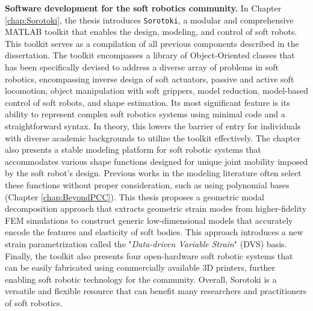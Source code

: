 \textbf{Software development for the soft robotics community.} In Chapter \ref{chap:Sorotoki}, the thesis introduces \texttt{Sorotoki}, a modular and comprehensive MATLAB\textsuperscript{\scriptsize\textregistered} toolkit that enables the design, modeling, and control of soft robots. This toolkit serves as a compilation of all previous components described in the dissertation. The toolkit encompasses a library of Object-Oriented classes that has been specifically devised to address a diverse array of problems in soft robotics, encompassing inverse design of soft actuators, passive and active soft locomotion, object manipulation with soft grippers, model reduction, model-based control of soft robots, and shape estimation. Its most significant feature is its ability to represent complex soft robotics systems using minimal code and a straightforward syntax. In theory, this lowers the barrier of entry for individuals with diverse academic backgrounds to utilize the toolkit effectively. The chapter also presents a stable modeling platform for soft robotic systems that accommodates various shape functions designed for unique joint mobility imposed by the soft robot's design. Previous works in the modeling literature often select these functions without proper consideration, such as using polynomial bases (Chapter \ref{chap:BeyondPCC}). This thesis proposes a geometric modal decomposition approach that extracts geometric strain modes from higher-fidelity FEM simulations to construct generic low-dimensional models that accurately encode the features and elasticity of soft bodies. This approach introduces a new strain parametrization called the "\textit{Data-driven Variable Strain}" (DVS) basis. Finally, the toolkit also presents four open-hardware soft robotic systems that can be easily fabricated using commercially available 3D printers, further enabling soft robotic technology for the community. Overall, Sorotoki is a versatile and flexible resource that can benefit many researchers and practitioners of soft robotics.

\vspace{-3mm}
